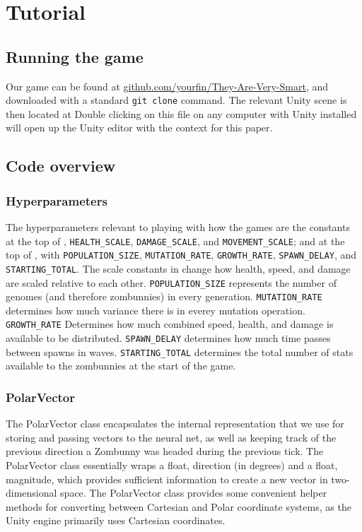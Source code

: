 \documentclass[letterpaper]{article}
\begin{document}
\section{Tutorial}

\subsection{Running the game}
Our game can be found at
\href{https://github.com/YourFin/They-Are-Very-Smart}{github.com/yourfin/They-Are-Very-Smart},
and downloaded with a standard \texttt{git clone} command. The relevant Unity
scene is then located at
Double clicking on this file on any computer with Unity installed will open up
the Unity editor with the context for this paper.

\subsection{Code overview}
\subsubsection{Hyperparameters}
The hyperparameters relevant to playing with how the games are the constants at
the top of , \texttt{HEALTH_SCALE},
\texttt{DAMAGE_SCALE}, and \texttt{MOVEMENT_SCALE}; and at the top of
, with
\texttt{POPULATION_SIZE}, \texttt{MUTATION_RATE}, \texttt{GROWTH_RATE},
\texttt{SPAWN_DELAY}, and \texttt{STARTING_TOTAL}. The scale constants in
 change how health, speed, and damage are scaled relative to
each other. \texttt{POPULATION_SIZE} represents the number of genomes (and
therefore zombunnies) in every generation. \texttt{MUTATION_RATE} determines how
much variance there is in everey mutation operation. \texttt{GROWTH_RATE}
Determines how much combined speed, health, and damage is available to be
distributed. \texttt{SPAWN_DELAY} determines how much time passes between spawns
in waves. \texttt{STARTING_TOTAL} determines the total number of stats available
to the zombunnies at the start of the game.

\subsubsection{PolarVector}
The PolarVector class encapsulates the internal representation that we use for storing and passing vectors to the neural net, as well as keeping track of the previous direction a Zombunny was headed during the previous tick. The PolarVector class essentially wraps a float, direction (in degrees) and a float, magnitude, which provides sufficient information to create a new vector in two-dimensional space. The PolarVector class provides some convenient helper methods for converting between Cartesian and Polar coordinate systems, as the Unity engine primarily uses Cartesian coordinates.
\end{document}
